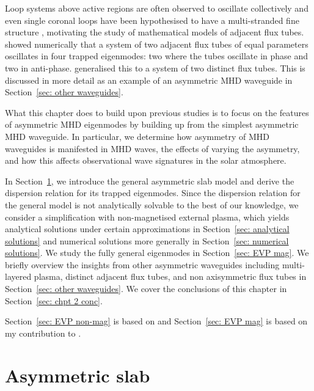 Loop systems above active regions are often observed to oscillate collectively and even single coronal loops have been hypothesised to have a multi-stranded fine structure \citep{asc_etal00}, motivating the study of mathematical models of adjacent flux tubes. \cite{lun_etal08} showed numerically that a system of two adjacent flux tubes of equal parameters oscillates in four trapped eigenmodes: two where the tubes oscillate in phase and two in anti-phase. \cite{van_etal08} generalised this to a system of two distinct flux tubes. This is discussed in more detail as an example of an asymmetric MHD waveguide in Section~\ref{sec: other waveguides}.

What this chapter does to build upon previous studies is to focus on the features of asymmetric MHD eigenmodes by building up from the simplest asymmetric MHD waveguide. In particular, we determine how asymmetry of MHD waveguides is manifested in MHD waves, the effects of varying the asymmetry, and how this affects observational wave signatures in the solar atmosphere.

In Section~\ref{sec: EVP asym slab}, we introduce the general asymmetric slab model and derive the dispersion relation for its trapped eigenmodes. Since the  dispersion relation for the general model is not analytically solvable to the best of our knowledge, we consider a simplification with non-magnetised external plasma, which yields analytical solutions under certain approximations in Section~\ref{sec: analytical solutions} and numerical solutions more generally in Section~\ref{sec: numerical solutions}. We study the fully general eigenmodes in Section~\ref{sec: EVP mag}. We briefly overview the insights from other asymmetric waveguides including multi-layered plasma, distinct adjacent flux tubes, and non axisymmetric flux tubes in Section~\ref{sec: other waveguides}. We cover the conclusions of this chapter in Section~\ref{sec: chpt 2 conc}.

Section~\ref{sec: EVP non-mag} is based on \cite{all_etal17} and Section~\ref{sec: EVP mag} is based on my contribution to \cite{zsa_etal18}.

\section{Asymmetric slab}
\label{sec: EVP asym slab}
